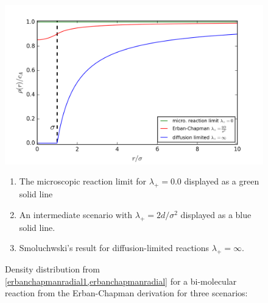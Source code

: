\documentclass[
  a4paper,BCOR10mm,twoside,
  headsepline,footsepline,%
  fleqn,openbib
]{scrbook}
\begin{document}
\begin{figure}[h!]
\captionsetup{singlelinecheck=off}
\centering
\includegraphics[width=\textwidth]{./data/smoluchowskierban.png}
\caption{Density distribution from \cref{erbanchapmanradial1,erbanchapmanradial} for a bi-molecular reaction from the Erban-Chapman derivation for three scenarios:}
\begin{small}
\begin{enumerate}
  \item The microscopic reaction limit for $\lambda_{+} =0.0$ displayed as a green solid line
  \item An intermediate scenario with $\lambda_{+} =2d/\sigma^2$ displayed as a blue solid line.
  \item Smoluchwski's result for diffusion-limited reactions   $\lambda_{+}=\infty $.
\end{enumerate}
\end{small}
  \label{fig:diffusion_limit-Erban-Chapmann-figure}
\end{figure}
\end{document}
